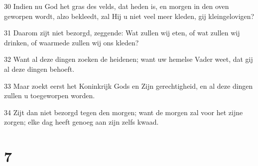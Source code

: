 \par 30 Indien nu God het gras des velds, dat heden is, en morgen in den oven geworpen wordt, alzo bekleedt, zal Hij u niet veel meer kleden, gij kleingelovigen?
\par 31 Daarom zijt niet bezorgd, zeggende: Wat zullen wij eten, of wat zullen wij drinken, of waarmede zullen wij ons kleden?
\par 32 Want al deze dingen zoeken de heidenen; want uw hemelse Vader weet, dat gij al deze dingen behoeft.
\par 33 Maar zoekt eerst het Koninkrijk Gods en Zijn gerechtigheid, en al deze dingen zullen u toegeworpen worden.
\par 34 Zijt dan niet bezorgd tegen den morgen; want de morgen zal voor het zijne zorgen; elke dag heeft genoeg aan zijn zelfs kwaad.

\chapter{7}

